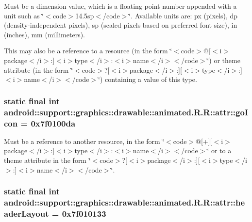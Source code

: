 Must be a dimension value, which is a floating point number appended with a unit such as \char`\"{}$<$code$>$14.5sp$<$/code$>$\char`\"{}. Available units are: px (pixels), dp (density-independent pixels), sp (scaled pixels based on preferred font size), in (inches), mm (millimeters). 

This may also be a reference to a resource (in the form \char`\"{}$<$code$>$@\mbox{[}$<$i$>$package$<$/i$>$:\mbox{]}$<$i$>$type$<$/i$>$:$<$i$>$name$<$/i$>$$<$/code$>$\char`\"{}) or theme attribute (in the form \char`\"{}$<$code$>$?\mbox{[}$<$i$>$package$<$/i$>$:\mbox{]}\mbox{[}$<$i$>$type$<$/i$>$:\mbox{]}$<$i$>$name$<$/i$>$$<$/code$>$\char`\"{}) containing a value of this type. \hypertarget{classandroid_1_1support_1_1graphics_1_1drawable_1_1animated_1_1_r_1_1attr_d5bbd9c46694798d66e484777698a07b}{
\subsubsection[{goIcon}]{\setlength{\rightskip}{0pt plus 5cm}static final int android::support::graphics::drawable::animated.R.R::attr::goIcon = 0x7f0100da}}
\label{classandroid_1_1support_1_1graphics_1_1drawable_1_1animated_1_1_r_1_1attr_d5bbd9c46694798d66e484777698a07b}


Must be a reference to another resource, in the form \char`\"{}$<$code$>$@\mbox{[}+\mbox{]}\mbox{[}$<$i$>$package$<$/i$>$:\mbox{]}$<$i$>$type$<$/i$>$:$<$i$>$name$<$/i$>$$<$/code$>$\char`\"{} or to a theme attribute in the form \char`\"{}$<$code$>$?\mbox{[}$<$i$>$package$<$/i$>$:\mbox{]}\mbox{[}$<$i$>$type$<$/i$>$:\mbox{]}$<$i$>$name$<$/i$>$$<$/code$>$\char`\"{}. \hypertarget{classandroid_1_1support_1_1graphics_1_1drawable_1_1animated_1_1_r_1_1attr_9e4319a4c66f2b04fdc6ac7823192420}{
\subsubsection[{headerLayout}]{\setlength{\rightskip}{0pt plus 5cm}static final int android::support::graphics::drawable::animated.R.R::attr::headerLayout = 0x7f010133}}
\label{classandroid_1_1support_1_1graphics_1_1drawable_1_1animated_1_1_r_1_1attr_9e4319a4c66f2b04fdc6ac7823192420}


